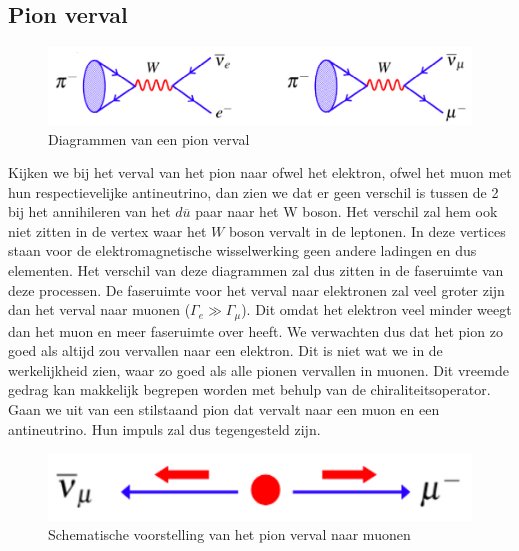 \documentclass[../main.tex]{subfiles}
\begin{document}
\subsection{Pion verval}%
\label{sub:pion_verval}

\begin{figure}[h]
    \centering
    \includegraphics[width=0.8\linewidth]{parity_violation/pion_verval.png}
    \caption{Diagrammen van een pion verval}%
    \label{fig:parity_violation/pion_verval}
\end{figure}

Kijken we bij het verval van het pion naar ofwel het elektron, ofwel het muon met hun respectievelijke antineutrino, dan zien we dat er geen verschil is tussen de 2 bij het annihileren van het $d\overline u$ paar naar het W boson. Het verschil zal hem ook niet zitten in de vertex waar het $W$ boson vervalt in de leptonen. In deze vertices staan voor de elektromagnetische wisselwerking geen andere ladingen en dus elementen. Het verschil van deze diagrammen zal dus zitten in de faseruimte van deze processen. De faseruimte voor het verval naar elektronen zal veel groter zijn dan het verval naar muonen ($\Gamma_e \gg \Gamma_\mu$). Dit omdat het elektron veel minder weegt dan het muon en meer faseruimte over heeft. We verwachten dus dat het pion zo goed als altijd zou vervallen naar een elektron. Dit is niet wat we in de werkelijkheid zien, waar zo goed als alle pionen vervallen in muonen. Dit vreemde gedrag kan makkelijk begrepen worden met behulp van de chiraliteitsoperator.\\
Gaan we uit van een stilstaand pion dat vervalt naar een muon en een antineutrino. Hun impuls zal dus tegengesteld zijn.

\begin{figure}[h]
    \centering
    \includegraphics[width=0.8\linewidth]{parity_violation/pion_verval_kin.png}
    \caption{Schematische voorstelling van het pion verval naar muonen}%
    \label{fig:parity_violation/pion_verval_kin}
\end{figure}
\end{document}
